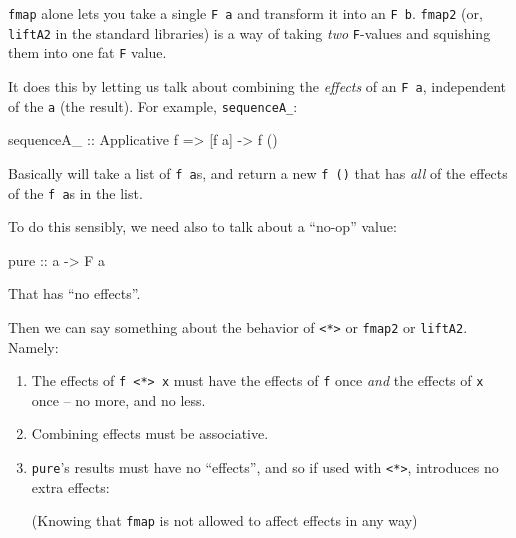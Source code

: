 \documentclass[]{article}
\newenvironment{Shaded}{}{}
\newcommand{\DataTypeTok}[1]{\textcolor[rgb]{0.56,0.13,0.00}{#1}}
\newcommand{\FunctionTok}[1]{\textcolor[rgb]{0.02,0.16,0.49}{#1}}
\newcommand{\NormalTok}[1]{#1}
\newcommand{\OtherTok}[1]{\textcolor[rgb]{0.00,0.44,0.13}{#1}}
\begin{document}
\texttt{fmap} alone lets you take a single \texttt{F\ a} and transform it into
an \texttt{F\ b}. \texttt{fmap2} (or, \texttt{liftA2} in the standard libraries)
is a way of taking \emph{two} \texttt{F}-values and squishing them into one fat
\texttt{F} value.

It does this by letting us talk about combining the \emph{effects} of an
\texttt{F\ a}, independent of the \texttt{a} (the result). For example,
\texttt{sequenceA\_}:

\begin{Shaded}
\begin{Highlighting}[]
\OtherTok{sequenceA_ ::} \DataTypeTok{Applicative}\NormalTok{ f }\OtherTok{=>}\NormalTok{ [f a] }\OtherTok{->}\NormalTok{ f ()}
\end{Highlighting}
\end{Shaded}

Basically will take a list of \texttt{f\ a}s, and return a new \texttt{f\ ()}
that has \emph{all} of the effects of the \texttt{f\ a}s in the list.

To do this sensibly, we need also to talk about a ``no-op'' value:

\begin{Shaded}
\begin{Highlighting}[]
\NormalTok{pure}\OtherTok{ ::}\NormalTok{ a }\OtherTok{->} \DataTypeTok{F}\NormalTok{ a}
\end{Highlighting}
\end{Shaded}

That has ``no effects''.

Then we can say something about the behavior of
\texttt{\textless{}*\textgreater{}} or \texttt{fmap2} or \texttt{liftA2}.
Namely:

\begin{enumerate}
\def\labelenumi{\arabic{enumi}.}
\item
  The effects of \texttt{f\ \textless{}*\textgreater{}\ x} must have the effects
  of \texttt{f} once \emph{and} the effects of \texttt{x} once -- no more, and
  no less.
\item
  Combining effects must be associative.
\item
  \texttt{pure}'s results must have no ``effects'', and so if used with
  \texttt{\textless{}*\textgreater{}}, introduces no extra effects:

\begin{Shaded}
\end{Shaded}

  (Knowing that \texttt{fmap} is not allowed to affect effects in any way)
\end{enumerate}
\end{document}
